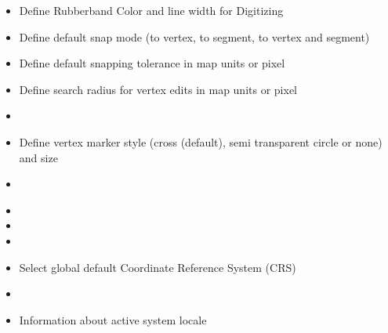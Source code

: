 
\begin{itemize}
\item Define Rubberband Color and line width for Digitizing
\item Define default snap mode (to vertex, to segment, to vertex and segment)
\item Define default snapping tolerance in map units or pixel
\item Define search radius for vertex edits in map units or pixel
\item {}
\item Define vertex marker style (cross (default), semi transparent circle or 
none) and size
\item {}
\end{itemize}


\begin{itemize}
\item {}
\item {}
\item {}
\item Select global default Coordinate Reference System (CRS)
\end{itemize}


\begin{itemize}
\item {}
\item Information about active system locale
\end{itemize}


